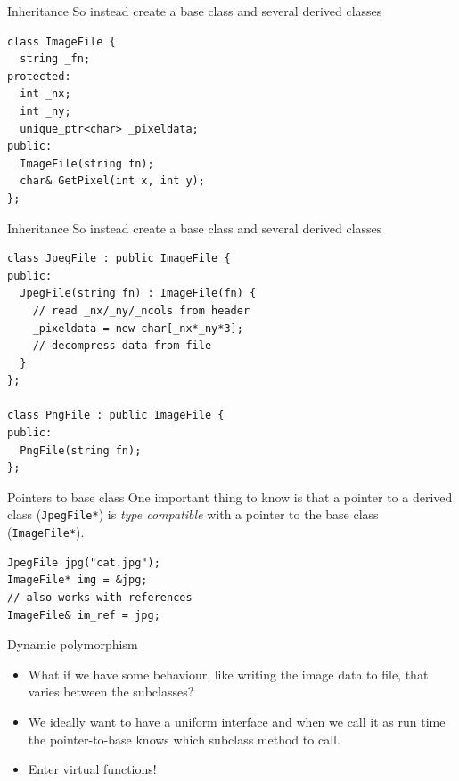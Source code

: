 \documentclass[presentation,t]{beamer}
\newcommand{\code}[1]{\lstinline!#1!}
\begin{document}
\begin{frame}[fragile]{Inheritance}
  So instead create a base class and several derived classes
\begin{lstlisting}
class ImageFile {
  string _fn;
protected:
  int _nx;
  int _ny;
  unique_ptr<char> _pixeldata;
public:
  ImageFile(string fn);
  char& GetPixel(int x, int y);
};
\end{lstlisting}
\end{frame}

\begin{frame}[fragile]{Inheritance}
  So instead create a base class and several derived classes
\begin{lstlisting}
class JpegFile : public ImageFile {
public:
  JpegFile(string fn) : ImageFile(fn) {
    // read _nx/_ny/_ncols from header
    _pixeldata = new char[_nx*_ny*3];
    // decompress data from file
  }
};

class PngFile : public ImageFile {
public:
  PngFile(string fn);
};

\end{lstlisting}
\end{frame}

\begin{frame}[fragile]{Pointers to base class}
One important thing to know is that a pointer to a derived class
(\code{JpegFile*}) is \emph{type compatible} with a pointer to the
base class (\code{ImageFile*}).

\begin{lstlisting}
JpegFile jpg("cat.jpg");
ImageFile* img = &jpg;
// also works with references
ImageFile& im_ref = jpg;
\end{lstlisting}

\end{frame}

\begin{frame}{Dynamic polymorphism}
  \begin{itemize}
  \item What if we have some behaviour, like writing the image data to
    file, that varies between the subclasses?

  \item We ideally want to have a uniform interface and when we call
    it as run time the pointer-to-base knows which subclass method to
    call.

  \item Enter virtual functions!
  \end{itemize}
\end{frame}
\end{document}
